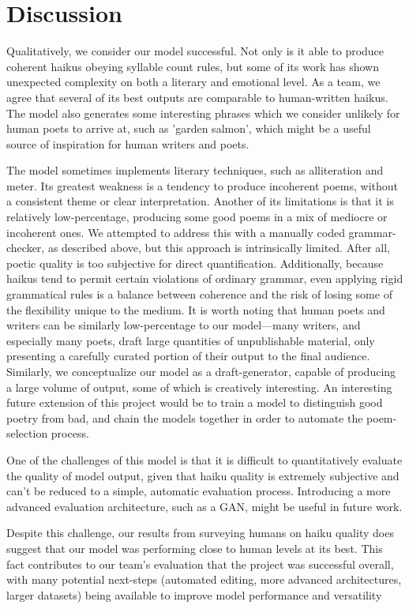 \documentclass{article} %
\begin{document}
\section{Discussion}

Qualitatively, we consider our model successful. Not only is it able to produce coherent haikus obeying syllable count rules, but some of its work has shown unexpected complexity on both a literary and emotional level.
As a team, we agree that several of its best outputs are comparable to human-written haikus.
The model also generates some interesting phrases which we consider unlikely for human poets to arrive at, such as 'garden salmon', which might be a useful source of inspiration for human writers and poets.

The model sometimes implements literary techniques, such as alliteration and meter.
Its greatest weakness is a tendency to produce incoherent poems, without a consistent theme or clear interpretation.
Another of its limitations is that it is relatively low-percentage, producing some good poems in a mix of mediocre or incoherent ones.
We attempted to address this with a manually coded grammar-checker, as described above, but this approach is intrinsically limited.
After all, poetic quality is too subjective for direct quantification.
Additionally, because haikus tend to permit certain violations of ordinary grammar, even applying rigid grammatical rules is a balance between coherence and the risk of losing some of the flexibility unique to the medium.
It is worth noting that human poets and writers can be similarly low-percentage to our model—many writers, and especially many poets, draft large quantities of unpublishable material, only presenting a carefully curated portion of their output to the final audience.
Similarly, we conceptualize our model as a draft-generator, capable of producing a large volume of output, some of which is creatively interesting.
An interesting future extension of this project would be to train a model to distinguish good poetry from bad, and chain the models together in order to automate the poem-selection process.

One of the challenges of this model is that it is difficult to quantitatively evaluate the quality of model output, given that haiku quality is extremely subjective and can't be reduced to a simple, automatic evaluation process.
Introducing a more advanced evaluation architecture, such as a GAN, might be useful in future work.

Despite this challenge, our results from surveying humans on haiku quality does suggest that our model was performing close to human levels at its best.
This fact contributes to our team's evaluation that the project was successful overall, with many potential next-steps (automated editing, more advanced architectures, larger datasets) being available to improve model performance and versatility



\newpage
\clearpage

\label{last_page}



\end{document}
